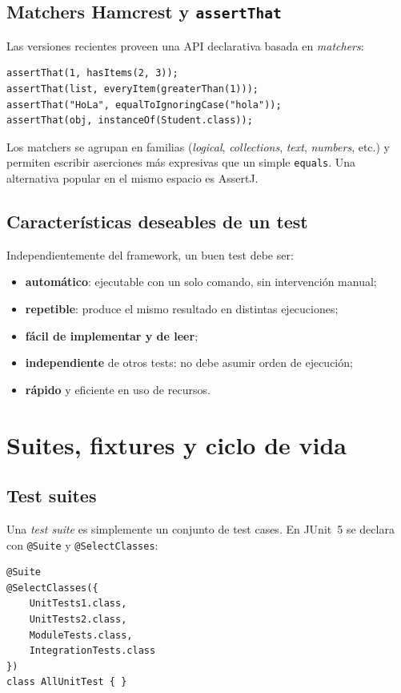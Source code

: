 \documentclass[12pt,a4paper]{article}
\begin{document}
\subsection{Matchers Hamcrest y \texttt{assertThat}}
Las versiones recientes proveen una API declarativa basada en \textit{matchers}:
\begin{lstlisting}[style=javastyle]
assertThat(1, hasItems(2, 3));
assertThat(list, everyItem(greaterThan(1)));
assertThat("HoLa", equalToIgnoringCase("hola"));
assertThat(obj, instanceOf(Student.class));
\end{lstlisting}
Los matchers se agrupan en familias (\textit{logical}, \textit{collections}, \textit{text}, \textit{numbers}, etc.) y permiten escribir aserciones más expresivas que un simple \texttt{equals}. Una alternativa popular en el mismo espacio es AssertJ.

\subsection{Características deseables de un test}
Independientemente del framework, un buen test debe ser:
\begin{itemize}
  \item \textbf{automático}: ejecutable con un solo comando, sin intervención manual;
  \item \textbf{repetible}: produce el mismo resultado en distintas ejecuciones;
  \item \textbf{fácil de implementar y de leer};
  \item \textbf{independiente} de otros tests: no debe asumir orden de ejecución;
  \item \textbf{rápido} y eficiente en uso de recursos.
\end{itemize}

\section{Suites, fixtures y ciclo de vida}

\subsection{Test suites}
Una \textit{test suite} es simplemente un conjunto de test cases. En JUnit~5 se declara con \texttt{@Suite} y \texttt{@SelectClasses}:
\begin{lstlisting}[style=javastyle]
@Suite
@SelectClasses({
    UnitTests1.class,
    UnitTests2.class,
    ModuleTests.class,
    IntegrationTests.class
})
class AllUnitTest { }
\end{lstlisting}
\end{document}
